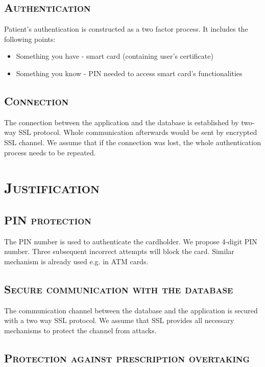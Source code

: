 \subsection{\textsc{Authentication}}

Patient's authentication is constructed as a two factor process. It includes the following points:
\begin{itemize}
\item Something you have - smart card (containing user's certificate)
\item Something you know - PIN needed to access smart card's functionalities
\end{itemize}

\subsection{\textsc{Connection}}

The connection between the application and the database is established by two-way SSL protocol. Whole communication afterwards would be sent by encrypted SSL channel. We assume that if the connection was lost, the whole authentication process needs to be repeated.

\section{\textsc{Justification}}

\subsection{\textsc{PIN protection}}

The PIN number is used to authenticate the cardholder. We propose 4-digit PIN number. Three subsequent incorrect attempts will block the card. Similar mechanism is already used e.g. in ATM cards.	

\subsection{\textsc{Secure communication with the database}}

The communication channel between the database and the application is secured with a two way SSL protocol. We assume that SSL provides all necessary mechanisms to protect the channel from attacks.

\subsection{\textsc{Protection against prescription overtaking}}

